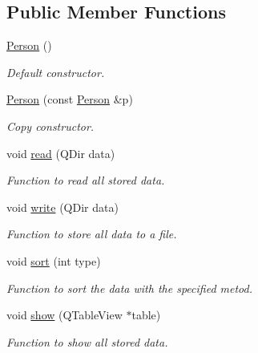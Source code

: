 \subsection*{Public Member Functions}
\begin{DoxyCompactItemize}
\item 
\hyperlink{class_person_a0397c6f89fafc12e738923f612bc41a3}{Person} ()
\begin{DoxyCompactList}\small\item\em Default constructor. \end{DoxyCompactList}\item 
\hyperlink{class_person_a847845e2e214a89e790c584678f1ea97}{Person} (const \hyperlink{class_person}{Person} \&p)
\begin{DoxyCompactList}\small\item\em Copy constructor. \end{DoxyCompactList}\item 
void \hyperlink{class_person_a98c73f33a51b80cc9296a949f2fc5cf3}{read} (Q\+Dir data)
\begin{DoxyCompactList}\small\item\em Function to read all stored data. \end{DoxyCompactList}\item 
void \hyperlink{class_person_aa667ce32c0552e818ac6df14c9a5f50d}{write} (Q\+Dir data)
\begin{DoxyCompactList}\small\item\em Function to store all data to a file. \end{DoxyCompactList}\item 
void \hyperlink{class_person_a602ce88a8ef959c3f4044d9dc00dd2cf}{sort} (int type)
\begin{DoxyCompactList}\small\item\em Function to sort the data with the specified metod. \end{DoxyCompactList}\item 
void \hyperlink{class_person_ac89ee9923a0b4a874be8f5901e35b753}{show} (Q\+Table\+View $\ast$table)
\begin{DoxyCompactList}\small\item\em Function to show all stored data. \end{DoxyCompactList}\end{DoxyCompactItemize}
